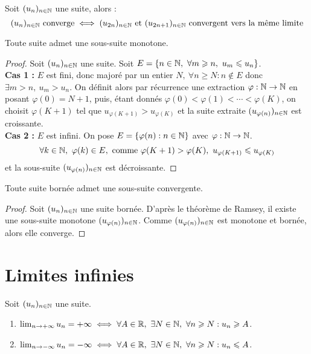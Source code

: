 \begin{proposition}
    Soit $(u_n)_{n \in \mathbb{N}}$ une suite, alors :
    \[ (u_n)_{n \in \mathbb{N}} \text{ converge} \iff (u_{2n})_{n \in \mathbb{N}} \text{ et } (u_{2n + 1})_{n \in \mathbb{N}} \text{ convergent vers la même limite} \]
\end{proposition}

\begin{theorem}
    Toute suite admet une sous-suite monotone.
\end{theorem}

\begin{proof}
    Soit $(u_n)_{n \in \mathbb{N}}$ une suite. Soit $E = \{ n \in \N,\ \forall m \geq n,\ u_m \leq u_n \}$.
    \\ 
    \textbf{Cas 1 :} $E$ est fini, donc majoré par un entier $N,\ \forall n \geq N : n \notin E$ donc $\exists m > n,\ u_m > u_n$. On définit alors par récurrence une extraction $\varphi : \mathbb{N} \to \mathbb{N}$ en posant $\varphi(0) = N + 1$, puis, étant donnés $\varphi(0) < \varphi(1) < \cdots < \varphi(K)$, on choisit $\varphi(K + 1)$ tel que $u_{\varphi(K+1)} > u_{\varphi(K)}$ et la suite extraite $(u_{\varphi(n)})_{n \in \mathbb{N}}$ est croissante.
    \\ 
    \textbf{Cas 2 :} $E$ est infini. On pose $E = \{ \varphi(n) : n \in \mathbb{N} \}$ avec $\varphi : \mathbb{N} \to \mathbb{N}$.
    \[ \forall k \in \mathbb{N},\ \varphi(k) \in E, \text{ comme } \varphi(K + 1) > \varphi(K),\ u_{\varphi(K+1)} \leqslant u_{\varphi(K)} \]
    et la sous-suite $(u_{\varphi(n)})_{n \in \mathbb{N}}$ est décroissante.
\end{proof}

\begin{theorem}
    Toute suite bornée admet une sous-suite convergente.
\end{theorem}

\begin{proof}
    Soit $(u_n)_{n \in \mathbb{N}}$ une suite bornée. D'après le théorème de Ramsey, il existe une sous-suite monotone $(u_{\varphi(n)})_{n \in \mathbb{N}}$. Comme $(u_{\varphi(n)})_{n \in \mathbb{N}}$ est monotone et bornée, alors elle converge.
\end{proof}

\section{Limites infinies}

\begin{definition}
    Soit $(u_n)_{n \in \mathbb{N}}$ une suite.
    \begin{enumerate}
        \item $\lim_{n \to +\infty} u_n = +\infty \iff \forall A \in \mathbb{R},\ \exists N \in \mathbb{N},\ \forall n \geqslant N : u_n \geqslant A$.
        \item $\lim_{n \to -\infty} u_n = -\infty \iff \forall A \in \mathbb{R},\ \exists N \in \mathbb{N},\ \forall n \geqslant N : u_n \leqslant A$.
    \end{enumerate}
\end{definition}

